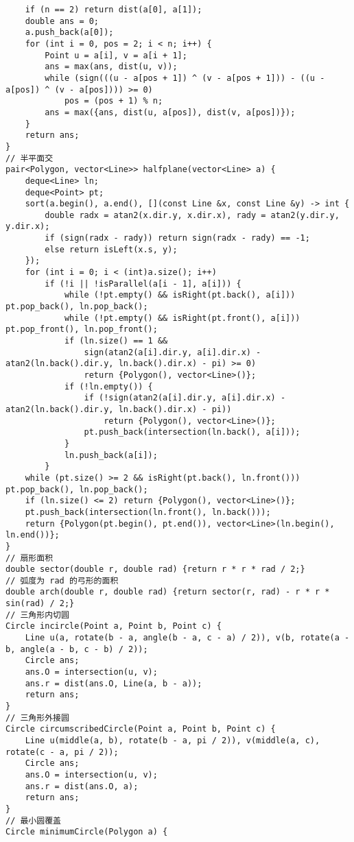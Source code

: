 \begin{verbatim}
    if (n == 2) return dist(a[0], a[1]);
    double ans = 0;
    a.push_back(a[0]);
    for (int i = 0, pos = 2; i < n; i++) {
        Point u = a[i], v = a[i + 1];
        ans = max(ans, dist(u, v));
        while (sign(((u - a[pos + 1]) ^ (v - a[pos + 1])) - ((u - a[pos]) ^ (v - a[pos]))) >= 0)
            pos = (pos + 1) % n;
        ans = max({ans, dist(u, a[pos]), dist(v, a[pos])});
    }
    return ans;
}
// 半平面交
pair<Polygon, vector<Line>> halfplane(vector<Line> a) {
    deque<Line> ln;
    deque<Point> pt;
    sort(a.begin(), a.end(), [](const Line &x, const Line &y) -> int {
        double radx = atan2(x.dir.y, x.dir.x), rady = atan2(y.dir.y, y.dir.x);
        if (sign(radx - rady)) return sign(radx - rady) == -1;
        else return isLeft(x.s, y);
    });
    for (int i = 0; i < (int)a.size(); i++)
        if (!i || !isParallel(a[i - 1], a[i])) {
            while (!pt.empty() && isRight(pt.back(), a[i])) pt.pop_back(), ln.pop_back();
            while (!pt.empty() && isRight(pt.front(), a[i])) pt.pop_front(), ln.pop_front();
            if (ln.size() == 1 &&
                sign(atan2(a[i].dir.y, a[i].dir.x) - atan2(ln.back().dir.y, ln.back().dir.x) - pi) >= 0)
                return {Polygon(), vector<Line>()};
            if (!ln.empty()) {
                if (!sign(atan2(a[i].dir.y, a[i].dir.x) - atan2(ln.back().dir.y, ln.back().dir.x) - pi))
                    return {Polygon(), vector<Line>()};
                pt.push_back(intersection(ln.back(), a[i]));
            }
            ln.push_back(a[i]);
        }
    while (pt.size() >= 2 && isRight(pt.back(), ln.front())) pt.pop_back(), ln.pop_back();
    if (ln.size() <= 2) return {Polygon(), vector<Line>()};
    pt.push_back(intersection(ln.front(), ln.back()));
    return {Polygon(pt.begin(), pt.end()), vector<Line>(ln.begin(), ln.end())};
}
// 扇形面积
double sector(double r, double rad) {return r * r * rad / 2;}
// 弧度为 rad 的弓形的面积
double arch(double r, double rad) {return sector(r, rad) - r * r * sin(rad) / 2;}
// 三角形内切圆
Circle incircle(Point a, Point b, Point c) {
    Line u(a, rotate(b - a, angle(b - a, c - a) / 2)), v(b, rotate(a - b, angle(a - b, c - b) / 2));
    Circle ans;
    ans.O = intersection(u, v);
    ans.r = dist(ans.O, Line(a, b - a));
    return ans;
}
// 三角形外接圆
Circle circumscribedCircle(Point a, Point b, Point c) {
    Line u(middle(a, b), rotate(b - a, pi / 2)), v(middle(a, c), rotate(c - a, pi / 2));
    Circle ans;
    ans.O = intersection(u, v);
    ans.r = dist(ans.O, a);
    return ans;
}
// 最小圆覆盖
Circle minimumCircle(Polygon a) {

\end{verbatim}
